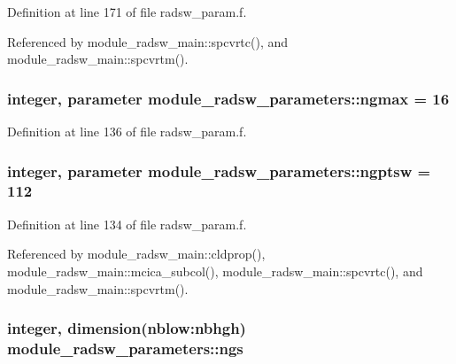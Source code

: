 Definition at line 171 of file radsw\+\_\+param.\+f.



Referenced by module\+\_\+radsw\+\_\+main\+::spcvrtc(), and module\+\_\+radsw\+\_\+main\+::spcvrtm().

\subsubsection[{\texorpdfstring{ngmax}{ngmax}}]{\setlength{\rightskip}{0pt plus 5cm}integer, parameter module\+\_\+radsw\+\_\+parameters\+::ngmax = 16}\hypertarget{namespacemodule__radsw__parameters_a0ba0ff5c18d3303a852d88687b4b5ca9}{}\label{namespacemodule__radsw__parameters_a0ba0ff5c18d3303a852d88687b4b5ca9}


Definition at line 136 of file radsw\+\_\+param.\+f.

\subsubsection[{\texorpdfstring{ngptsw}{ngptsw}}]{\setlength{\rightskip}{0pt plus 5cm}integer, parameter module\+\_\+radsw\+\_\+parameters\+::ngptsw = 112}\hypertarget{namespacemodule__radsw__parameters_adc3e4d5a848d50e2883e05c62f61bc97}{}\label{namespacemodule__radsw__parameters_adc3e4d5a848d50e2883e05c62f61bc97}


Definition at line 134 of file radsw\+\_\+param.\+f.



Referenced by module\+\_\+radsw\+\_\+main\+::cldprop(), module\+\_\+radsw\+\_\+main\+::mcica\+\_\+subcol(), module\+\_\+radsw\+\_\+main\+::spcvrtc(), and module\+\_\+radsw\+\_\+main\+::spcvrtm().

\subsubsection[{\texorpdfstring{ngs}{ngs}}]{\setlength{\rightskip}{0pt plus 5cm}integer, dimension(nblow\+:nbhgh) module\+\_\+radsw\+\_\+parameters\+::ngs}\hypertarget{namespacemodule__radsw__parameters_a715ab3195493dff0639da443c21e4fb5}{}\label{namespacemodule__radsw__parameters_a715ab3195493dff0639da443c21e4fb5}


